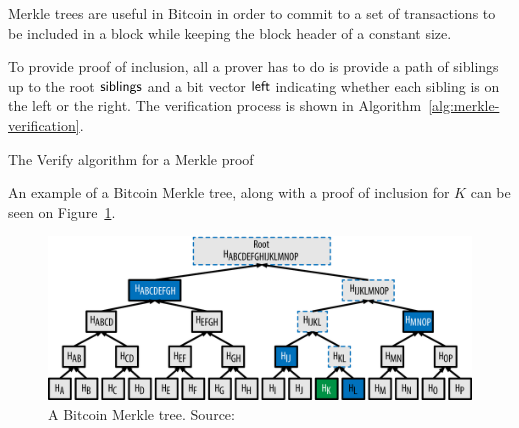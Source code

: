 Merkle trees are useful in Bitcoin in order to commit to a set of
transactions to be included in a block while keeping the block header of a
constant size.

To provide proof of inclusion, all a prover has to do is provide a path of
siblings up to the root $\sf{siblings}$ and a bit vector $\sf{left}$ indicating
whether each sibling is on the left or the right. The verification process is
shown in Algorithm~\ref{alg:merkle-verification}.

\begin{algorithm}[H]
  \caption{\label{alg:merkle-verification}The \textsf{Verify} algorithm
    for a Merkle proof}
    \begin{algorithmic}[1]
              \Else
              \EndIf
            \EndWhile
            \State{}
        \EndFunction
    \end{algorithmic}
\end{algorithm}

An example of a Bitcoin Merkle tree, along with a proof of inclusion for $K$ can be seen on Figure~\ref{fig:merkletree}.

\begin{figure}
  \centering
  \includegraphics[width=0.9\columnwidth,keepaspectratio]{figures/merkle-tree-proof.png}
  \caption{A Bitcoin Merkle tree. Source:~\cite{mastering}}
  \label{fig:merkletree}
\end{figure}

